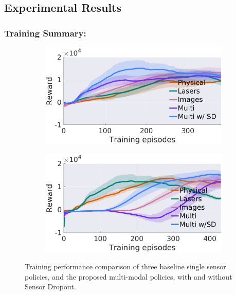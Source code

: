 \documentclass[../thesis.tex]{subfiles}
\begin{document}
\subsection{Experimental Results} %
\subsubsection{Training Summary:}

\begin{figure}[t]
	\centering
	\begin{subfigure}[b]{0.48\linewidth}
		\includegraphics[width=\columnwidth]{./MultimodalDRL/fig/training_exp_naf}
		\label{fig:training_exp_naf}
	\end{subfigure}
	\begin{subfigure}[b]{0.48\linewidth}
		\includegraphics[width=\columnwidth]{./MultimodalDRL/fig/training_exp_ddpg}
		\label{fig:training_exp_ddpg}
	\end{subfigure}
	\caption{Training performance comparison of three baseline single sensor policies, and the proposed multi-modal policies, with and without Sensor Dropout.}
	\label{fig:training_exp}
\end{figure}
\end{document}
